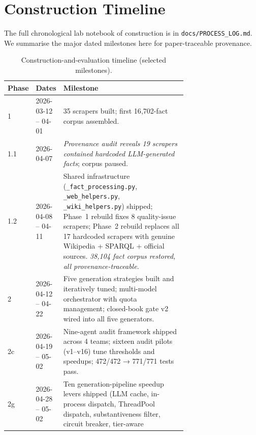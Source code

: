 \section{Construction Timeline}
\label{app:timeline}

The full chronological lab notebook of construction is in
\texttt{docs/PROCESS\_LOG.md}. We summarise the major dated milestones
here for paper-traceable provenance.

\begin{table}[h]
  \centering
  \footnotesize
  \caption{Construction-and-evaluation timeline (selected milestones).}
  \label{tab:timeline}
  \begin{tabular}{llp{0.7\linewidth}}
    \toprule
    Phase & Dates & Milestone \\
    \midrule
    1   & 2026-03-12 -- 04-01 & 35 scrapers built; first 16{,}702-fact corpus assembled. \\
    1.1 & 2026-04-07         & \emph{Provenance audit reveals 19 scrapers contained
                               hardcoded LLM-generated facts}; corpus paused. \\
    1.2 & 2026-04-08 -- 04-11 & Shared infrastructure
                               (\texttt{\_fact\_processing.py},
                               \texttt{\_web\_helpers.py},
                               \texttt{\_wiki\_helpers.py}) shipped;
                               Phase~1 rebuild fixes 8 quality-issue scrapers; Phase~2
                               rebuild replaces all 17 hardcoded scrapers with genuine
                               Wikipedia + SPARQL + official sources. \emph{38{,}104
                               fact corpus restored, all provenance-traceable.} \\
    2   & 2026-04-12 -- 04-22 & Five generation strategies built and iteratively
                               tuned; multi-model orchestrator with quota management;
                               closed-book gate v2 wired into all five generators. \\
    2c  & 2026-04-19 -- 05-02 & Nine-agent audit framework shipped across 4 teams;
                               sixteen audit pilots (v1--v16) tune thresholds and
                               speedups; 472/472 → 771/771 tests pass. \\
    2g  & 2026-04-28 -- 05-02 & Ten generation-pipeline speedup levers shipped
                               (LLM cache, in-process dispatch, ThreadPool dispatch,
                               substantiveness filter, circuit breaker, tier-aware

\end{tabular}
\end{table}
